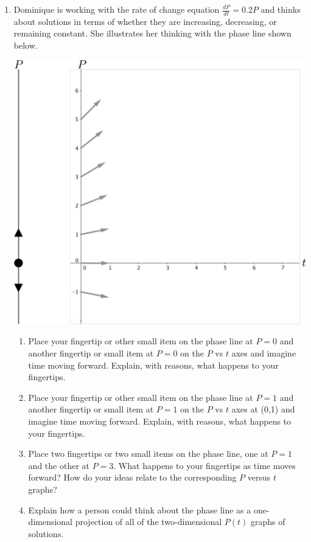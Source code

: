 \clearpage


\begin{enumerate}[resume]
\item Dominique is working with the rate of change equation $\frac{dP}{dt}=0.2P$  and thinks about solutions in terms of whether they are increasing, decreasing, or remaining constant. She illustrates her thinking with the phase line shown below. 
\begin{center}
\includegraphics[width=6in]{06/06PhaseLineAndSomeVectors.pdf} \\
\end{center}
\clearpage
\begin{enumerate}
\item	Place your fingertip or other small item on the phase line at $P = 0$ and another fingertip or small item at $P = 0$ on the $P$ vs $t$ axes and imagine time moving forward. Explain, with reasons, what happens to your fingertips. \label{06problem5parta} \vfill

\item	Place your fingertip or other small item on the phase line at $P = 1$ and another fingertip or small item at $P = 1$ on the $P$ vs $t$ axes at (0,1) and imagine time moving forward. Explain, with reasons, what happens to your fingertips. \label{06problem5partb}   \vfill

\item	Place two fingertips or two small items on the phase line, one at $P = 1$ and the other at $P = 3$. What happens to your fingertips as time moves forward? How do your ideas relate to the corresponding $P$ versus $t$ graphs? \label{06problem5partc}  \vfill

\item	Explain how a person could think about the phase line as a one-dimensional projection of all of the two-dimensional $P(t)$ graphs of solutions. \label{06problem5partd} \vfill

\end{enumerate}
\end{enumerate}
\clearpage

